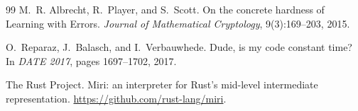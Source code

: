 \documentclass[11pt,a4paper]{article}
\theoremstyle{plain}
\theoremstyle{definition}
\theoremstyle{remark}
\begin{document}
\begin{thebibliography}{99}
M.~R. Albrecht, R.~Player, and S.~Scott.
\newblock On the concrete hardness of Learning with Errors.
\newblock \emph{Journal of Mathematical Cryptology}, 9(3):169--203,
2015.

O.~Reparaz, J.~Balasch, and I.~Verbauwhede.
\newblock Dude, is my code constant time?
\newblock In \emph{DATE 2017}, pages 1697--1702, 2017.

The Rust Project.
\newblock Miri: an interpreter for Rust's mid-level intermediate
representation.
\newblock \url{https://github.com/rust-lang/miri}.

\end{thebibliography}
\end{document}
